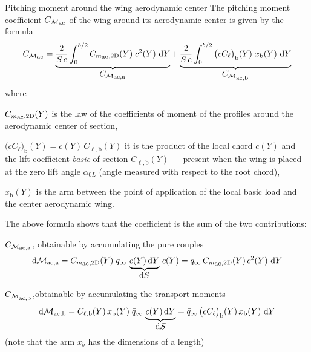 \documentclass[[12pt,twoside]{book}
\begin{document}
\begin{myExampleX}{Pitching moment around the wing aerodynamic center}{}
The pitching moment coefficient $C_{\mathcal{M}_\mathlarger{\mathrm{ac}}}$ of the wing
around its aerodynamic center is given by the formula
\[
C_{\mathcal{M}_\mathlarger{\mathrm{ac}}}
  = 
    \underbrace{%
      \frac{2}{S\,\bar{c}} \int_0^{b/2} C_{m_\mathlarger{\mathrm{ac}},\mathrm{2D}}(Y) \; c^2(Y)\, \diff{Y}
    }_{ \mathlarger{ C_{\mathcal{M}_\mathlarger{\mathrm{ac,a}}} } } 
    +
    \underbrace{%
      \frac{2}{S\,\bar{c}} \int_0^{b/2} \big(cC_{\ell}\big)_\mathrm{b}(Y) \; x_\mathrm{b}(Y)\, \diff{Y}
    }_{ \mathlarger{ C_{\mathcal{M}_\mathlarger{\mathrm{ac,b}}} } } 
\]
%
where 
\begin{compactenum}[{\color{gray}$\bullet$}]%
\item
$C_{m_\mathlarger{\mathrm{ac}},\mathrm{2D}}(Y)$ is the law of the coefficients of
moment of the profiles around the aerodynamic center of section,
\item
$\big(cC_{\ell}\big)_\mathrm{b}(Y) = c(Y) \, C_{\ell,\mathrm{b}} (Y)$ it is the product of the local chord
$c(Y)$ and the lift coefficient \emph{basic} of section
$C_{\ell,\mathrm{b}}(Y)$ --- present when
the wing is placed at the zero lift angle $\alpha_{0L}$ (angle measured with respect to the root chord),
\item
$x_\mathrm{b}(Y)$ is the arm between the point of application of the local basic load and the center
aerodynamic wing.
\end{compactenum}

The above formula shows that the coefficient 
is the sum of the two contributions:
\begin{compactenum}
\item
$C_{\mathcal{M}_\mathlarger{\mathrm{ac,a}}}$, obtainable by accumulating the pure couples 
  \[
    \diff{}\mathcal{M}_{\mathrm{ac},\mathrm{a}} 
      = C_{m_\mathlarger{\mathrm{ac}},\mathrm{2D}}(Y) \; \bar{q}_\infty \,
        \underbrace{%
          c(Y)\diff{Y}
        }_{ \mathlarger{ \diff{S} } }
          \, c(Y)
    = \bar{q}_\infty \, C_{m_\mathlarger{\mathrm{ac}},\mathrm{2D}}(Y) \, c^2(Y) \, \diff{Y} 
  \]
\item
$C_{\mathcal{M}_\mathlarger{\mathrm{ac,b}}}$,obtainable by accumulating the transport moments
  \[
    \diff{}\mathcal{M}_{\mathrm{ac},\mathrm{b}} 
      = C_{\ell,\mathrm{b}}(Y)\,x_\mathrm{b}(Y)\; \bar{q}_\infty \, 
        \underbrace{%
          c(Y)\diff{Y}
        }_{ \mathlarger{ \diff{S} } }
    = \bar{q}_\infty \, \big( cC_{\ell} \big)_\mathrm{b} (Y) \,x_\mathrm{b}(Y)\, \diff{Y}
  \]
\hfill(note that the arm $x_b$ has the dimensions of a length)
\end{compactenum}


\end{myExampleX}
\end{document}
